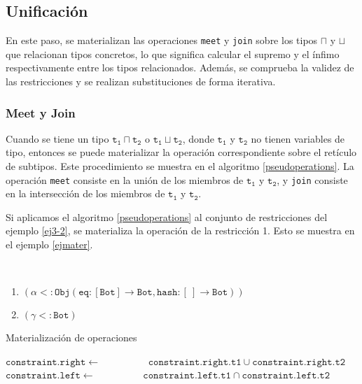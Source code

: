 \subsection{Unificación}
En este paso, se materializan las operaciones \texttt{meet} y \texttt{join} sobre los tipos $\sqcap$ y $\sqcup$ que relacionan tipos concretos, lo que significa calcular el supremo y el ínfimo respectivamente entre los tipos relacionados. Además, se comprueba la validez de las restricciones y se realizan substituciones de forma iterativa.

\subsubsection{Meet y Join}
Cuando se tiene un tipo $\mathtt{t_1 \sqcap t_2}$ o $\mathtt{t_1 \sqcup t_2}$, donde $\mathtt{t_1}$ y $\mathtt{t_2}$ no tienen variables de tipo, entonces se puede materializar la operación correspondiente sobre el retículo de subtipos. Este procedimiento se muestra en el algoritmo \ref{pseudoperations}. La operación \texttt{meet} consiste en la unión de los miembros de $\mathtt{t_1}$ y $\mathtt{t_2}$, y \texttt{join} consiste en la intersección de los miembros de $\mathtt{t_1}$ y $\mathtt{t_2}$.

Si aplicamos el algoritmo \ref{pseudoperations} al conjunto de restricciones del ejemplo \ref{ej3-2}, se materializa la operación de la restricción 1. Esto se muestra en el ejemplo \ref{ejmater}.
\clearpage
\begin{ej}\
  \normalfont
  \label{ejmater}
  \begin{enumerate}
    \item $\mathtt{(\alpha <: Obj(eq : [Bot] \rightarrow Bot, hash : [\ ] \rightarrow Bot))}$
    \item $\mathtt{(\gamma <: Bot)}$
  \end{enumerate}
\end{ej}


\begin{algorithm}\captionsetup{labelsep=newline}
  \centering
  \caption{Materialización de operaciones}
  \label{pseudoperations}
    \begin{algorithmic}[1]
              \State $\mathtt{constraint.right\gets}$
              \State \ \ \ \ \ \ \ \ \ $\mathtt{constraint.right.t1 \cup constraint.right.t2}$
            \EndIf
              \State $\mathtt{constraint.left\gets}$
              \State \ \ \ \ \ \ \ \ \ $\mathtt{constraint.left.t1 \cap constraint.left.t2}$
            \EndIf
          \EndFor
      \EndFunction
    \end{algorithmic}
\end{algorithm}

